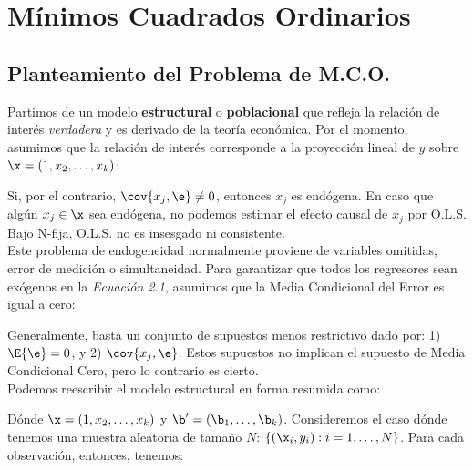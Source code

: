 \chapter{Mínimos Cuadrados Ordinarios}

\section{Planteamiento del Problema de M.C.O.}

Partimos de un modelo \textbf{estructural} o \textbf{poblacional} que refleja la relación de interés \textit{verdadera} y es derivado de la teoría económica. Por el momento, asumimos que la relación de interés corresponde a la proyección lineal de $y$ sobre $\x=(1,x_2,\hdots,x_k)$:


\bigskip
Si, por el contrario, $\cov{x_j,\e}\neq 0$, entonces $x_j$ es endógena. En caso que algún $x_j\in\x$ sea endógena, no podemos estimar el efecto causal de $x_j$ por O.L.S. Bajo N-fija, O.L.S. no es insesgado ni consistente. \\

Este problema de endogeneidad normalmente proviene de variables omitidas, error de medición o simultaneidad. Para garantizar que todos los regresores sean exógenos en la \textit{Ecuación 2.1}, asumimos que la Media Condicional del Error es igual a cero:

\bigskip
Generalmente, basta un conjunto de supuestos menos restrictivo dado por: 1) $\E{\e}=0$, y 2) $\cov{x_j, \e}$. Estos supuestos no implican el supuesto de Media Condicional Cero, pero lo contrario es cierto.\\

Podemos reescribir el modelo estructural en forma resumida como:

\bigskip
Dónde $\x=(1,x_2,\hdots, x_k)$ y $\b'=(\b_1,\hdots, \b_k)$. Consideremos el caso dónde tenemos una muestra aleatoria de tamaño $N$: $\lbrace (\x_i, y_i): i=1,\hdots, N \rbrace$. Para cada observación, entonces, tenemos:

